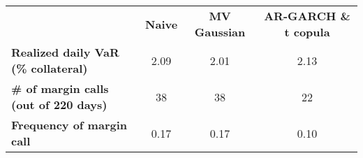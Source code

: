 \begin{small}\begin{tabular}{ l c c c }
&\textbf{Naive}&\textbf{MV Gaussian}&\textbf{AR-GARCH \& t copula}\\
\textbf{Realized daily VaR (\% collateral)}&2.09&2.01&2.13\\
\textbf{\# of margin calls (out of 220 days)}&38&38&22\\
\textbf{Frequency of margin call}&0.17&0.17&0.10\\
\end{tabular}
\end{small}
